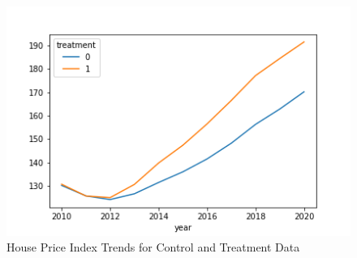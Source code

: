 \begin{figure}[h]
    \centering
    \includegraphics[width=.8\linewidth]{../data_and_processing/media/pta.png}
    \caption{House Price Index Trends for Control and Treatment Data}
    \label{pta}
\end{figure}
